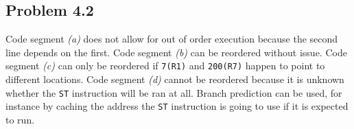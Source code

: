 \documentclass[12pt,letterpaper]{article}
\begin{document}
\subsection*{Problem 4.2}

Code segment \textit{(a)} does not allow for out of order execution because the second line depends on the
first. Code segment \textit{(b)} can be reordered without issue. Code segment \textit{(c)} can only be reordered if
\lstinline{7(R1)} and \lstinline{200(R7)} happen to point to different locations. Code segment \textit{(d)} cannot be reordered
because it is unknown whether the \lstinline{ST} instruction will be ran at all. Branch prediction can be used,
for instance by caching the address the \lstinline{ST} instruction is going to use if it is expected to run.
\end{document}
